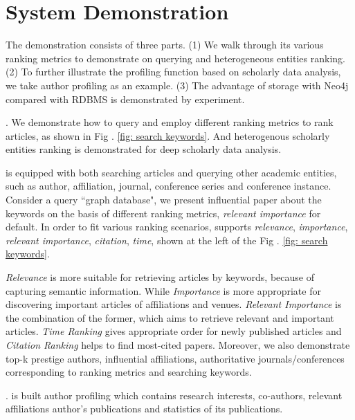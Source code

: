 \section{System Demonstration}
\label{sec-demo}

The demonstration consists of three parts. (1) We walk through its various ranking metrics to demonstrate \oursystem on querying and heterogeneous entities ranking. (2) To further illustrate the profiling function based on scholarly data analysis, we take author profiling as an example. (3) The advantage of storage with Neo4j compared with RDBMS is demonstrated by experiment.

. We demonstrate how to query and employ different ranking metrics to rank articles, as shown in Fig . \ref{fig: search keywords}. And heterogenous scholarly entities ranking is demonstrated for deep scholarly data analysis.

\par
\oursystem is equipped with both searching articles and querying other academic entities, such as author, affiliation, journal, conference series and conference instance. Consider a query ``graph database", we present influential paper about the keywords on the basis of different ranking metrics, {\em relevant importance} for default. In order to fit various ranking scenarios, \oursystem supports {\em relevance}, {\em importance}, {\em relevant importance}, {\em citation}, {\em time}, shown at the left of the Fig . \ref{fig: search keywords}.

\par
{\em Relevance} is more suitable for retrieving articles by keywords, because of capturing semantic information. While {\em Importance} is more appropriate for discovering important articles of affiliations and venues. {\em Relevant Importance} is the combination of the former, which aims to retrieve relevant and important articles. {\em Time Ranking} gives appropriate order for newly published articles and {\em Citation Ranking} helps to find most-cited papers. Moreover, we also demonstrate top-k prestige authors, influential affiliations, authoritative journals/conferences corresponding to ranking metrics and searching keywords.


. \oursystem is built author profiling which contains research interests, co-authors, relevant affiliations author's publications and statistics of its publications. 

